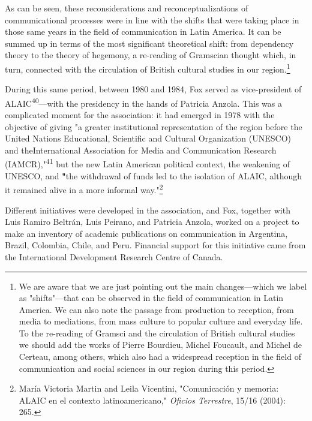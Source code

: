 \documentclass{tufte-handout}
\begin{document}
\noindent As can be seen, these reconsiderations and reconceptualizations of
communicational processes were in line with the shifts that were taking
place in those same years in the field of communication in Latin
America. It can be summed up in terms of the most significant
theoretical shift: from dependency theory to the theory of hegemony, a
re-reading of Gramscian thought which, in turn, connected with the
circulation of British cultural studies in our region.\footnote{We are
  aware that we are just pointing out the main changes---which we label
  as "shifts"---that can be observed in the field of communication in
  Latin America. We can also note the passage from production to
  reception, from media to mediations, from mass culture to popular
  culture and everyday life. To the re-reading of Gramsci and the
  circulation of British cultural studies we should add the works of
  Pierre Bourdieu, Michel Foucault, and Michel de Certeau, among others,
  which also had a widespread reception in the field of communication
  and social sciences in our region during this period.}



During this same period, between 1980 and 1984, Fox served as
vice-president of ALAIC\textsuperscript{40}---with
the presidency in the hands of Patricia Anzola. This was a complicated
moment for the association: it had emerged in 1978 with the objective of
giving "a greater institutional representation of the region before the
United Nations Educational, Scientific and Cultural Organization
(UNESCO) and the\newpage\noindent International Association for Media and Communication
Research (IAMCR),"\textsuperscript{41} but the new Latin American political
context, the weakening of UNESCO, and \textbf{"}the withdrawal of funds
led to the isolation of ALAIC, although it remained alive in a more
informal way."\footnote{María Victoria Martin and Leila Vicentini,
  "Comunicación y memoria: ALAIC en el contexto latinoamericano,"
  \emph{Oficios Terrestre}, 15/16 (2004): 265.}

Different initiatives were developed in the association, and Fox,
together with Luis Ramiro Beltrán, Luis Peirano, and Patricia Anzola,
worked on a project to make an inventory of academic publications on
communication in Argentina, Brazil, Colombia, Chile, and Peru. Financial
support for this initiative came from the International Development
Research Centre of Canada.
\end{document}
